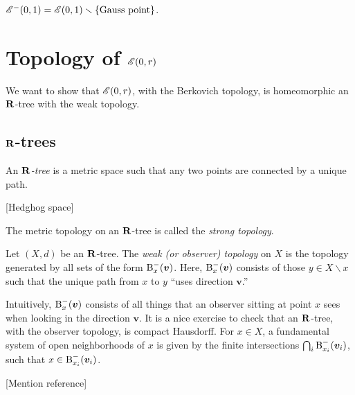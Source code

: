 \begin{example}
$\mathscr{E}^-(0,1)=\mathscr{E}(0,1)\smallsetminus \{\text{Gauss point}\}$. 
\end{example}





\section{Topology of \texorpdfstring{$\mathscr{E}(0,r)$}{E(0,r)}}

We want to show that $\mathscr{E}(0,r)$, with the Berkovich topology, is homeomorphic 
an $\mathbf{R}$-tree with the weak topology. 





\subsection{\texorpdfstring{$\mathbf{R}$}{R}-trees}

\begin{definition}
An \emph{$\mathbf{R}$-tree} is a metric space such that any two points are connected 
by a unique path.
\end{definition}

[Hedghog space]

The metric topology on an $\mathbf{R}$-tree is called the \emph{strong topology}. 

\begin{definition}
Let $(X,d)$ be an $\mathbf{R}$-tree. The \emph{weak (or observer) topology} on $X$ is 
the topology generated by all sets of the form $\operatorname{B}_x^-(\bm v)$. Here, 
$\operatorname{B}_x^-(\bm v)$ consists of those $y\in X\smallsetminus x$ such that the unique 
path from $x$ to $y$ ``uses direction $\bm v$.''
\end{definition}

Intuitively, $\operatorname{B}_x^-(\bm v)$ consists of all things that an observer sitting at 
point $x$ sees when looking in the direction $\bm v$. It is a nice exercise to 
check that an $\mathbf{R}$-tree, with the observer topology, is compact Hausdorff. For 
$x\in X$, a fundamental system of open neighborhoods of $x$ is given by the 
finite intersections $\bigcap_i \operatorname{B}_{x_i}^-(\bm v_i)$, such that 
$x\in \operatorname{B}_{x_i}^-(\bm v_i)$. 

[Mention reference]


